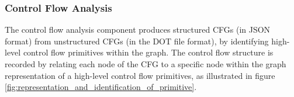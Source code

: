 
\subsubsection{Control Flow Analysis}
\label{sec:design_control_flow_analysis}

The control flow analysis component produces structured CFGs (in JSON format) from unstructured CFGs (in the DOT file format), by identifying high-level control flow primitives within the graph. The control flow structure is recorded by relating each node of the CFG to a specific node within the graph representation of a high-level control flow primitives, as illustrated in figure \ref{fig:representation_and_identification_of_primitive}.

